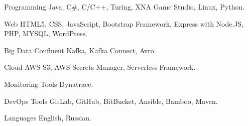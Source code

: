 \vspace{-1.75mm}


\begin{cvskills}


\cvskill
{Programming} %
{Java, C\#, C/C++, Turing, XNA Game Studio, Linux, Python.} %


\cvskill
{Web} %
{HTML5, CSS, JavaScript, Bootstrap Framework, Express with Node.JS, PHP, MYSQL, WordPress.} %


\cvskill
{Big Data} %
{Confluent Kafka, Kafka Connect, Avro.} %

\cvskill
{Cloud} %
{AWS S3, AWS Secrets Manager, Serverless Framework.} %

\cvskill
{Monitoring Tools} %
{Dynatrace.} %

\cvskill
{DevOps Tools} %
{GitLab, GitHub, BitBucket, Ansible, Bamboo, Maven.} %

\cvskill
{Languages} %
{English, Russian.} %


\end{cvskills}